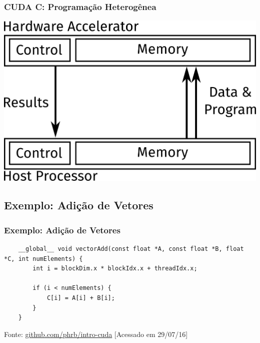 \documentclass[10pt, compress]{beamer}
\begin{document}
\begin{frame}
    \frametitle{CUDA C: Programação Heterogênea}
    \centering
    \includegraphics[width=.8\textwidth]{accel}
\end{frame}

\subsection{Exemplo: Adição de Vetores}

\begin{frame}[fragile]
    \frametitle{Exemplo: Adição de Vetores}
    \begin{lstlisting}
    __global__ void vectorAdd(const float *A, const float *B, float *C, int numElements) {
        int i = blockDim.x * blockIdx.x + threadIdx.x;

        if (i < numElements) {
            C[i] = A[i] + B[i];
        }
    }
    \end{lstlisting}

    \vfill

    \begin{center}
        \tiny{Fonte: \url{github.com/phrb/intro-cuda} [Acessado em 29/07/16]}
    \end{center}
\end{frame}
\end{document}
